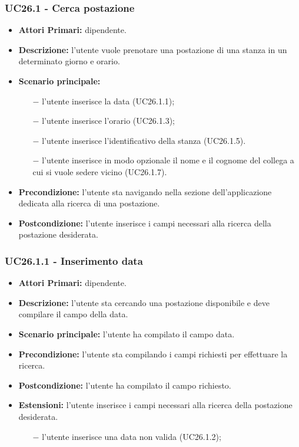 \subsubsection{ UC26.1 - Cerca postazione}
\begin{itemize}
	\item\textbf{Attori Primari:} dipendente.
	\item\textbf{Descrizione:} l’utente vuole prenotare una postazione di una stanza in un determinato giorno e orario.
	\item\textbf{Scenario principale:} 
	\begin{itemize}
		\item[$-$] l’utente inserisce la data (UC26.1.1);
		\item[$-$] l’utente inserisce l'orario (UC26.1.3);
		\item[$-$] l’utente inserisce l'identificativo della stanza (UC26.1.5).
		\item[$-$] l’utente inserisce in modo opzionale il nome e il cognome del collega a cui si vuole sedere vicino (UC26.1.7).
	\end{itemize}
	\item\textbf{Precondizione:} l’utente sta navigando nella sezione dell'applicazione dedicata alla ricerca di una postazione.
	\item\textbf{Postcondizione:} l’utente inserisce i campi necessari alla ricerca della postazione desiderata.
\end{itemize}
\subsubsection{ UC26.1.1 - Inserimento data }
\begin{itemize}
	\item\textbf{Attori Primari:} dipendente.
	\item\textbf{Descrizione:} l’utente sta cercando una postazione disponibile e deve compilare il campo della data.
	\item\textbf{Scenario principale:} l’utente ha compilato il campo data.
	\item\textbf{Precondizione:} l’utente sta compilando i campi richiesti per effettuare la ricerca.
	\item\textbf{Postcondizione:} l’utente ha compilato il campo richiesto.
	\item\textbf{Estensioni:} l’utente inserisce i campi necessari alla ricerca della postazione desiderata.
	\begin{itemize}
		\item[$-$] l’utente inserisce una data non valida (UC26.1.2);
	\end{itemize}
\end{itemize}
